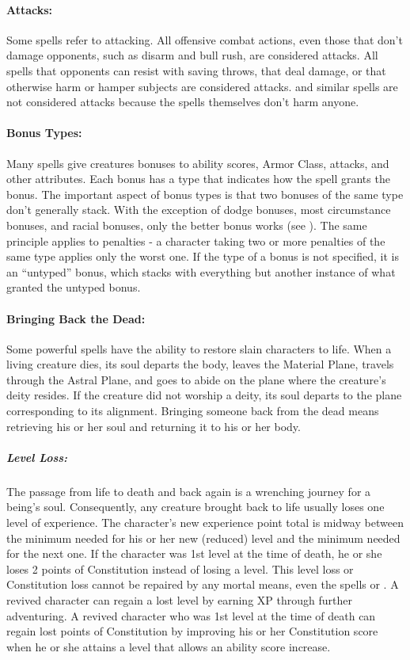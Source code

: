 \paragraph{Attacks:} Some spells refer to attacking. 
All offensive combat actions, even those that don't damage opponents, such as disarm and bull rush, are considered attacks. 
All spells that opponents can resist with saving throws, that deal damage, or that otherwise harm or hamper subjects are considered attacks. 
 and similar spells are not considered attacks because the spells themselves don't harm anyone.

\paragraph{Bonus Types:} Many spells give creatures bonuses to ability scores, Armor Class, attacks, and other attributes. 
Each bonus has a type that indicates how the spell grants the bonus. 
The important aspect of bonus types is that two bonuses of the same type don't generally stack. 
With the exception of dodge bonuses, most circumstance bonuses, and racial bonuses, only the better bonus works (see ).
The same principle applies to penalties - a character taking two or more penalties of the same type applies only the worst one.
If the type of a bonus is not specified, it is an ``untyped'' bonus, which stacks with everything but another instance of what granted the untyped bonus.

\paragraph{Bringing Back the Dead:} Some powerful spells have the ability to restore slain characters to life. 
When a living creature dies, its soul departs the body, leaves the Material Plane, travels through the Astral Plane, and goes to abide on the plane where the creature's deity resides. 
If the creature did not worship a deity, its soul departs to the plane corresponding to its alignment. 
Bringing someone back from the dead means retrieving his or her soul and returning it to his or her body.

\subparagraph{Level Loss:} The passage from life to death and back again is a wrenching journey for a being's soul. 
Consequently, any creature brought back to life usually loses one level of experience.
The character's new experience point total is midway between the minimum needed for his or her new (reduced) level and the minimum needed for the next one. 
If the character was 1st level at the time of death, he or she loses 2 points of Constitution instead of losing a level. 
This level loss or Constitution loss cannot be repaired by any mortal means, even the spells  or . 
A revived character can regain a lost level by earning XP through further adventuring. 
A revived character who was 1st level at the time of death can regain lost points of Constitution by improving his or her Constitution score when he or she attains a level that allows an ability score increase.

